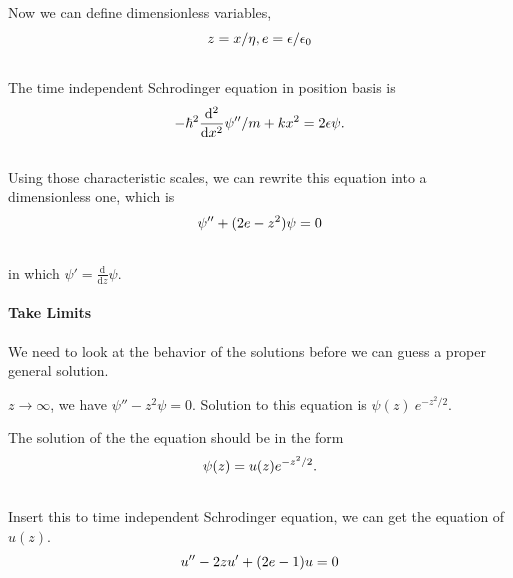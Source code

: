 \documentclass[letterpaper,10pt,english]{sphinxmanual}
\begin{document}
Now we can define dimensionless variables,
\begin{gather}
\begin{split}z=x/\eta, e=\epsilon/\epsilon_0\end{split}\notag\\\begin{split}\end{split}\notag
\end{gather}
The time independent Schrodinger equation in position basis is
\begin{gather}
\begin{split}-\hbar^2 \frac{\mathrm d^2}{\mathrm dx^2}\psi'' /m + k x^2 = 2\epsilon \psi .\end{split}\notag\\\begin{split}\end{split}\notag
\end{gather}
Using those characteristic scales, we can rewrite this equation into a dimensionless one, which is
\begin{gather}
\begin{split}\psi''+(2e-z^2)\psi = 0\end{split}\notag\\\begin{split}\end{split}\notag
\end{gather}
in which $\psi'=\frac{\mathrm d}{\mathrm dz}\psi$.


\paragraph{Take Limits}
\label{QuantumMechanics:take-limits}
We need to look at the behavior of the solutions before we can guess a proper general solution.

$z\rightarrow \infty$, we have $\psi''-z^2\psi=0$. Solution to this equation is $\psi(z)~ e^{-z^2/2}$.

The solution of the the equation should be in the form
\begin{gather}
\begin{split}\psi(z) = u(z) e^{-z^2/2}  .\end{split}\notag\\\begin{split}\end{split}\notag
\end{gather}
Insert this to time independent Schrodinger equation, we can get the equation of $u(z)$.
\begin{gather}
\begin{split}u'' - 2 z u' +(2e-1) u = 0\end{split}\notag\\\begin{split}\end{split}\notag
\end{gather}
\end{document}
